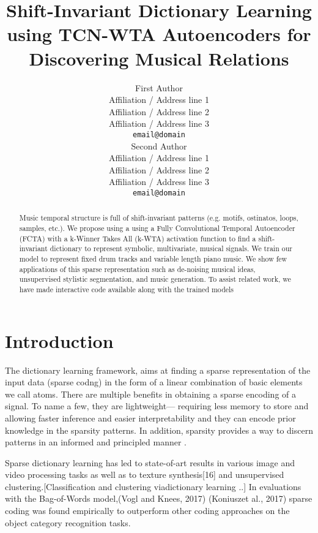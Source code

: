 \documentclass[11pt,a4paper]{article}
\title{Shift-Invariant Dictionary Learning using TCN-WTA Autoencoders for Discovering Musical Relations }
\author{First Author \\
  Affiliation / Address line 1 \\
  Affiliation / Address line 2 \\
  Affiliation / Address line 3 \\
  \texttt{email@domain} \\\And
  Second Author \\
  Affiliation / Address line 1 \\
  Affiliation / Address line 2 \\
  Affiliation / Address line 3 \\
  \texttt{email@domain} \\}
\date{}
\begin{document}
\maketitle
\begin{abstract}
Music temporal structure is full of shift-invariant patterns (e.g. motifs, ostinatos, loops, samples, etc.).  We propose using a using a Fully Convolutional Temporal Autoencoder (FCTA) with a k-Winner Takes All (k-WTA) activation function to find a shift-invariant dictionary to represent symbolic, multivariate, musical signals. We train our model to represent fixed drum tracks and variable length piano music. We show few applications of this sparse representation such as de-noising musical ideas, unsupervised stylistic segmentation, and music generation. To assist related work, we have made interactive code available along with the trained models 



\end{abstract}

\section{Introduction}

The dictionary learning framework, aims at finding a sparse representation of the input data (sparse codng) in the form of a linear combination of basic elements we call atoms. There are multiple benefits in obtaining a sparse encoding of a signal. To name a few, they are lightweight— requiring less memory to store and allowing faster inference and easier interpretability and they can encode prior knowledge in the sparsity patterns. In addition, sparsity provides a way to discern patterns in an informed and principled manner . 

 Sparse dictionary learning has led to state-of-art results in various image and video processing tasks as well as to texture synthesis[16] and unsupervised clustering.[Classification and clustering viadictionary learning ..] In evaluations with the Bag-of-Words model,(Vogl and Knees, 2017) (Koniuszet al., 2017) sparse coding was found empirically to outperform other coding approaches on the object category recognition tasks.  
 
\end{document}

